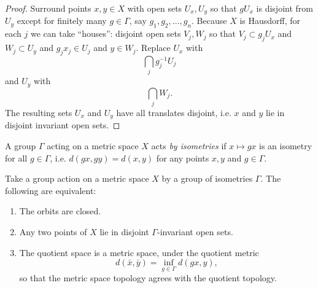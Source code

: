 \begin{proof}
Surround points \(x, y \in X\) with open sets \(U_x, U_y\) so that \(gU_x\) is disjoint from \(U_y\) except for finitely many \(g \in \Gamma\), say \(g_1, g_2, \dots, g_n\).
Because \(X\) is Hausdorff, for each \(j\) we can take ``houses'': disjoint open sets \(V_j, W_j\) so that \(V_j \subset g_j U_x\) and \(W_j \subset U_y\) and \(g_j x_j \in U_j\) and \(y \in W_j\).
Replace \(U_x\) with
\[
\bigcap_j g_j^{-1} U_j
\]
and \(U_y\) with
\[
\bigcap_j W_j.
\]
The resulting sets \(U_x\) and \(U_y\) have all translates disjoint, i.e. \(x\) and \(y\) lie in disjoint invariant open sets.
\end{proof}
A group \(\Gamma\) acting on a metric space \(X\) acts \emph{by isometries}%
%
%
if \(x \mapsto gx\) is an isometry for all \(g \in \Gamma\), i.e. \(d(gx,gy)=d(x,y)\) for any points \(x,y\) and \(g \in \Gamma\).
\begin{theorem}\label{theorem:metric.quotient}
Take a group action on a metric space \(X\) by a group of isometries \(\Gamma\).
The following are equivalent:
\begin{enumerate}
\item
The orbits are closed.
\item
Any two points of \(X\) lie in disjoint \(\Gamma\)-invariant open sets.
\item
The quotient space is a metric space, under the quotient metric
\[
d(\bar{x},\bar{y})=\inf_{g \in \Gamma} d(gx,y),
\]
so that the metric space topology agrees with the quotient topology.
\end{enumerate}
\end{theorem}
